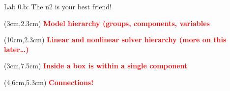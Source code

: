 \documentclass[aspectratio=169, usenames,dvipsnames, 14pt]{beamer}
\begin{document}
\begin{frame}{Lab 0.b: The n2 is your best friend!}
    \begin{textblock*}{4.25cm}(3cm,2.3cm)
        \footnotesize \textcolor{red}{\textbf{Model hierarchy (groups, components, variables}}
    \end{textblock*}
    
    \begin{textblock*}{4cm}(10cm,2.3cm)
      \footnotesize \textcolor{red}{\textbf{Linear and nonlinear solver hierarchy (more on this later…)}}
    \end{textblock*}
        
    \begin{textblock*}{3cm}(3cm,7.5cm)
      \footnotesize \textcolor{red}{\textbf{Inside a box is within a single component}}
    \end{textblock*}
    
    \begin{textblock*}{4cm}(4.6cm,5.3cm)
        \footnotesize \textcolor{red}{\textbf{Connections!}}        %
    \end{textblock*}
    
    


\end{frame}

\end{document}
